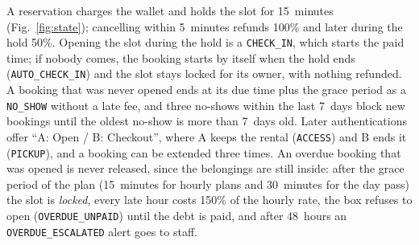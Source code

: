 A reservation charges the wallet and holds the slot for 15~minutes (Fig.~\ref{fig:state}); cancelling within
5~minutes refunds 100\% and later during the hold 50\%. Opening the slot during the hold is a \texttt{CHECK\_IN}, which
starts the paid time; if nobody comes, the booking starts by itself when the hold ends (\texttt{AUTO\_CHECK\_IN}) and
the slot stays locked for its owner, with nothing refunded. A booking that was never opened ends at its due time plus
the grace period as a \texttt{NO\_SHOW} without a late fee, and three no-shows within the last 7~days block new bookings
until the oldest no-show is more than 7~days old. Later authentications offer ``A: Open / B: Checkout'', where A keeps the
rental (\texttt{ACCESS}) and B ends it (\texttt{PICKUP}), and a booking can be extended three times. An overdue booking
that was opened is never released, since the belongings are still inside: after the grace period of the plan (15~minutes
for hourly plans and 30~minutes for the day pass) the slot is \emph{locked}, every late hour costs 150\% of the hourly rate,
the box refuses to open (\texttt{OVERDUE\_UNPAID}) until the debt is paid, and after 48~hours an \texttt{OVERDUE\_ESCALATED}
alert goes to staff.

